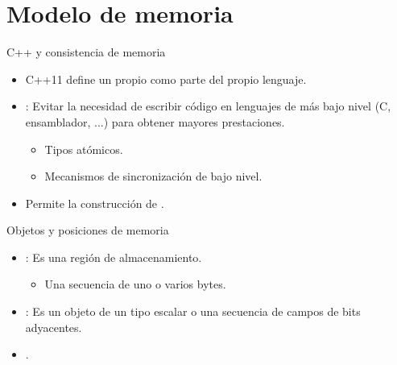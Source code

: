 \section{Modelo de memoria}

\begin{frame}{C++ y consistencia de memoria}
\begin{itemize}
  \item C++11 define un  propio como parte del propio lenguaje.

  \item {}: 
        Evitar la necesidad de escribir código en lenguajes de más bajo nivel (C, ensamblador, ...) para obtener mayores prestaciones.
    \begin{itemize}
      \item Tipos atómicos.
      \item Mecanismos de sincronización de bajo nivel.
    \end{itemize}

  \item Permite la construcción de .
\end{itemize}
\end{frame}

\begin{frame}{Objetos y posiciones de memoria}
\begin{itemize}
  \item {}: Es una región de almacenamiento.
    \begin{itemize}
      \item Una secuencia de uno o varios bytes.
    \end{itemize}

  \item {}: Es un objeto de un tipo escalar o una secuencia de campos de bits adyacentes.

  \item {}.
\end{itemize}
\end{frame}

